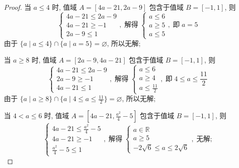 \begin{proof}
当 \(a \leq  4\) 时, 值域 \(A = \left\lbrack  {{4a} - {21}, {2a} - 9}\right\rbrack\) 包含于值域 \(B = \left\lbrack  {-1, 1}\right\rbrack\), 则
\[
\begin{cases}
{4a} - {21} \leq  {2a} - 9 \\
{4a} - {21} \geq  -1 \\
{2a} - 9 \leq  1
\end{cases}, 
\; \text{解得} \;
\begin{cases}
a \leq  {6} \\
a \geq  5 \\
a \leq  5
\end{cases}, 
\; \text{即} \; a = 5
\]
由于 \(\{ a \mid  a \leq  4\}  \cap  \{ a \mid  a = 5\}  = \varnothing\), 所以无解;

当 \(a \geq  8\) 时, 值域 \(A = \left\lbrack  {{2a} - 9, {4a} - {21}}\right\rbrack\) 包含于值域 \(B = \left\lbrack  {-1, 1}\right\rbrack\), 则
\[
\begin{cases}
{4a} - {21} \leq  {2a} - 9 \\
{2a} - 9 \geq  -1 \\
{4a} - {21} \leq  1
\end{cases}, 
\; \text{解得} \;
\begin{cases}
a \leq  {6} \\
a \geq  4 \\
a \leq  \frac{11}{2}
\end{cases}, 
\; \text{即} \; 4 \leq  a \leq  \frac{11}{2}
\]
由于 \(\{ a \mid  a \geq  8\}  \cap  \{ a \mid  4 \leq  a \leq  \frac{11}{2}\}  = \varnothing\), 所以无解;

当 \(4 < a \leq  6\) 时, 值域 \(A = \left\lbrack  {{4a} - {21}, \frac{{a}^{2}}{4} - 5}\right\rbrack\) 包含于值域 \(B = \left\lbrack  {-1, 1}\right\rbrack\), 则
\[
\begin{cases}
{4a} - {21} \leq  \frac{a^2}{4} - 5 \\
{4a} - {21} \geq  -1 \\
\frac{{a}^{2}}{4} - 5 \leq  1
\end{cases}, 
\; \text{解得} \;
\begin{cases}
a \in \mathbb{R} \\
a \geq  5 \\
 -2\sqrt{6} \leq  a \leq  2\sqrt{6}
\end{cases}, 
\; \text{无解;}
\]


\end{proof}
